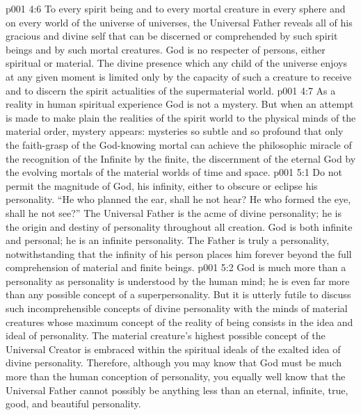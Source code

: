 \vs p001 4:6 To every spirit being and to every mortal creature in every sphere and on every world of the universe of universes, the Universal Father reveals all of his gracious and divine self that can be discerned or comprehended by such spirit beings and by such mortal creatures. God is no respecter of persons, either spiritual or material. The divine presence which any child of the universe enjoys at any given moment is limited only by the capacity of such a creature to receive and to discern the spirit actualities of the supermaterial world.
\vs p001 4:7 As a reality in human spiritual experience God is not a mystery. But when an attempt is made to make plain the realities of the spirit world to the physical minds of the material order, mystery appears: mysteries so subtle and so profound that only the faith\hyp{}grasp of the God\hyp{}knowing mortal can achieve the philosophic miracle of the recognition of the Infinite by the finite, the discernment of the eternal God by the evolving mortals of the material worlds of time and space.
\vs p001 5:1 Do not permit the magnitude of God, his infinity, either to obscure or eclipse his personality. “He who planned the ear, shall he not hear? He who formed the eye, shall he not see?” The Universal Father is the acme of divine personality; he is the origin and destiny of personality throughout all creation. God is both infinite and personal; he is an infinite personality. The Father is truly a personality, notwithstanding that the infinity of his person places him forever beyond the full comprehension of material and finite beings.\plusone
\vs p001 5:2 God is much more than a personality as personality is understood by the human mind; he is even far more than any possible concept of a superpersonality. But it is utterly futile to discuss such incomprehensible concepts of divine personality with the minds of material creatures whose maximum concept of the reality of being consists in the idea and ideal of personality. The material creature’s highest possible concept of the Universal Creator is embraced within the spiritual ideals of the exalted idea of divine personality. Therefore, although you may know that God must be much more than the human conception of personality, you equally well know that the Universal Father cannot possibly be anything less than an eternal, infinite, true, good, and beautiful personality.

